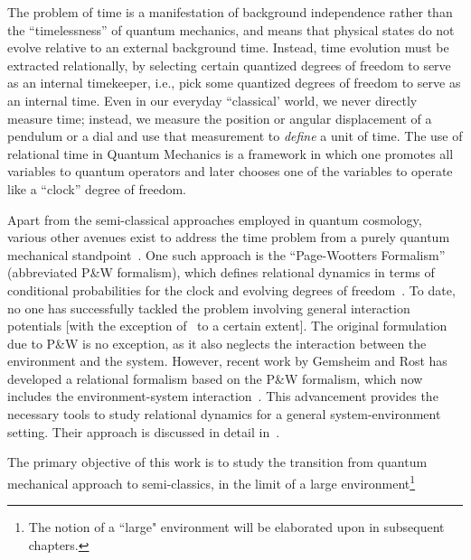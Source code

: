 The problem of time is a manifestation of background independence rather than the
``timelessness'' of quantum mechanics, and means that physical states do not evolve
relative to an external background time. Instead, time evolution must be extracted relationally, 
by selecting certain quantized degrees of freedom to serve as an internal timekeeper, 
i.e., pick some quantized degrees of freedom to serve as an internal time. 
Even in our everyday ``classical' world, we never directly measure time; instead, we measure the
position or angular displacement of a pendulum or a dial and use that measurement to \emph{define} a
unit of time. The use of relational time in Quantum
Mechanics is a framework in which one promotes all variables to quantum operators and
later chooses one of the variables to operate like a ``clock'' degree of freedom.

Apart from the semi-classical approaches employed in quantum cosmology, various other 
avenues exist to address the time problem from a purely quantum mechanical standpoint~\cite{hohn2021trinity}. 
One such approach is the ``Page-Wootters Formalism'' (abbreviated P\&W formalism), 
which defines relational dynamics in terms of conditional probabilities for the clock and 
evolving degrees of freedom~\cite{page1983evolution}. To date, no one has successfully tackled 
the problem involving general interaction potentials [with the exception of~\cite{Smith:2017pwx} 
to a certain extent]. The original formulation due to P\&W is no exception, as it also neglects 
the interaction between the environment and the system. However, recent work by Gemsheim and Rost 
has developed a relational formalism based on the P\&W formalism, which now includes the 
environment-system interaction~\cite{Gemsheim:2023izg}. This advancement provides the necessary 
tools to study relational dynamics for a general system-environment setting. Their approach is 
discussed in detail in~.


The primary objective of this work is to study the transition from quantum mechanical approach to semi-classics, in the limit of a 
large environment\footnote{The notion of a ``large" environment will be elaborated upon
in subsequent chapters.}

\newpage